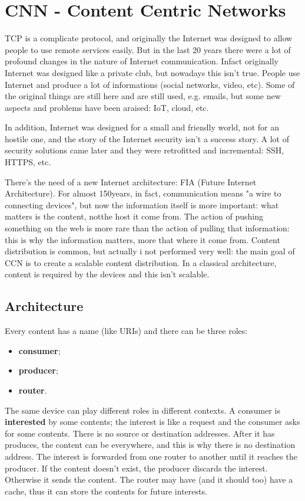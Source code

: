 \section{CNN - Content Centric Networks}
TCP is a complicate protocol, and originally the Internet was designed to allow
people to use remote services easily. But in the last 20 years there were a lot
of profound changes in the nature of Internet communication. Infact originally
Internet was designed like a private club, but nowadays this isn't true. People
use Internet and produce a lot of informations (social networks, video, etc).
Some of the original things are still here and are still used, e.g. emails, but
some new aspects and problems have been araised: IoT, cloud, etc.

In addition, Internet was designed for a small and friendly world, not for an
hostile one, and the story of the Internet security isn't a success story. A
lot of security solutions came later and they were retrofitted and incremental:
SSH, HTTPS, etc.

There's the need of a new Internet architecture: FIA (Future Internet
Architecture). For almost 150years, in fact, communication means "a wire to
connecting devices", but now the information itself is more important: what
matters is the content, notthe host it come from. The action of pushing
something on the web is more rare than the action of pulling that information:
this is why the information matters, more that where it come from. Content
distribution is common, but actually i not performed very well: the main goal
of CCN is to create a scalable content distribution. In a classical
architecture, content is required by the devices and this isn't scalable.

\subsection{Architecture}
Every content has a name (like URIs) and there can be three roles:
\begin{itemize}
  \item \textbf{consumer};
  \item \textbf{producer};
  \item \textbf{router}.
\end{itemize}
The same device can play different roles in different contexts. A consumer is
\textbf{interested} by some contents; the interest is like a request and the
consumer asks for some contents. There is no source or destination addresses.
After it has produces, the content can be everywhere, and this is why there is
no destination address. The interest is forwarded from one router to another
until it reaches the producer. If the content doesn't exist, the producer
discards the interest. Otherwise it sends the content. The router may have (and
it should too) have a cache, thus it can store the contents for future
interests.

